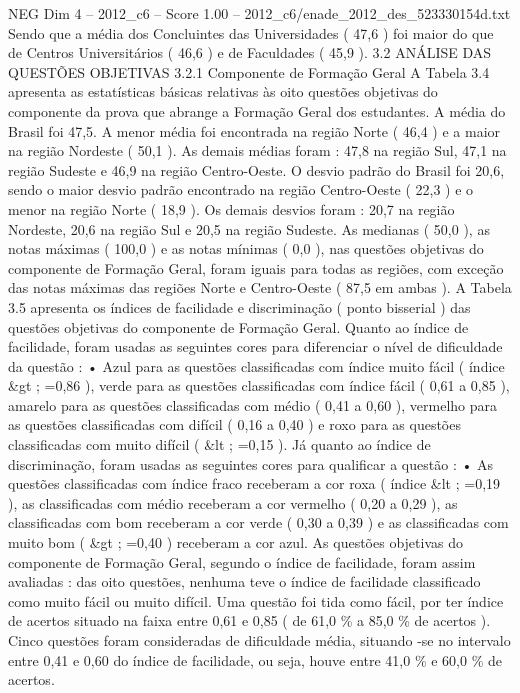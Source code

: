 \begin{textsample}{NEG Dim 4 – 2012\_c6 – Score 1.00 – 2012\_c6/enade\_2012\_des\_523330154d.txt}
Sendo que a média dos Concluintes das Universidades ( 47,6 ) foi maior do que de Centros Universitários ( 46,6 ) e de Faculdades ( 45,9 ). 3.2 ANÁLISE DAS QUESTÕES OBJETIVAS 3.2.1 Componente de Formação Geral A Tabela 3.4 apresenta as estatísticas básicas relativas às oito questões objetivas do componente da prova que abrange a Formação Geral dos estudantes.
A média do Brasil foi 47,5.
A menor média foi encontrada na região Norte ( 46,4 ) e a maior na região Nordeste ( 50,1 ).
As demais médias foram : 47,8 na região Sul, 47,1 na região Sudeste e 46,9 na região Centro-Oeste.
O desvio padrão do Brasil foi 20,6, sendo o maior desvio padrão encontrado na região Centro-Oeste ( 22,3 ) e o menor na região Norte ( 18,9 ).
Os demais desvios foram : 20,7 na região Nordeste, 20,6 na região Sul e 20,5 na região Sudeste.
As medianas ( 50,0 ), as notas máximas ( 100,0 ) e as notas mínimas ( 0,0 ), nas questões objetivas do componente de Formação Geral, foram iguais para todas as regiões, com exceção das notas máximas das regiões Norte e Centro-Oeste ( 87,5 em ambas ).
A Tabela 3.5 apresenta os índices de facilidade e discriminação ( ponto bisserial ) das questões objetivas do componente de Formação Geral.
Quanto ao índice de facilidade, foram usadas as seguintes cores para diferenciar o nível de dificuldade da questão : • Azul para as questões classificadas com índice muito fácil ( índice \&gt ; =0,86 ), verde para as questões classificadas com índice fácil ( 0,61 a 0,85 ), amarelo para as questões classificadas com médio ( 0,41 a 0,60 ), vermelho para as questões classificadas com difícil ( 0,16 a 0,40 ) e roxo para as questões classificadas com muito difícil ( \&lt ; =0,15 ).
Já quanto ao índice de discriminação, foram usadas as seguintes cores para qualificar a questão : • As questões classificadas com índice fraco receberam a cor roxa ( índice \&lt ; =0,19 ), as classificadas com médio receberam a cor vermelho ( 0,20 a 0,29 ), as classificadas com bom receberam a cor verde ( 0,30 a 0,39 ) e as classificadas com muito bom ( \&gt ; =0,40 ) receberam a cor azul.
As questões objetivas do componente de Formação Geral, segundo o índice de facilidade, foram assim avaliadas : das oito questões, nenhuma teve o índice de facilidade classificado como muito fácil ou muito difícil.
Uma questão foi tida como fácil, por ter índice de acertos situado na faixa entre 0,61 e 0,85 ( de 61,0 \% a 85,0 \% de acertos ).
Cinco questões foram consideradas de dificuldade média, situando -se no intervalo entre 0,41 e 0,60 do índice de facilidade, ou seja, houve entre 41,0 \% e 60,0 \% de acertos.

\end{textsample}
